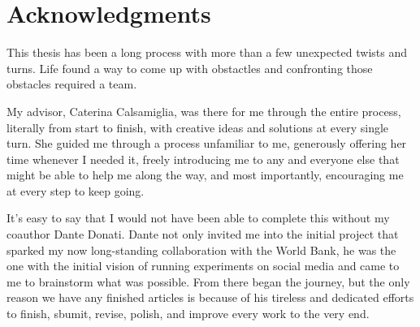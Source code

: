\chapter*{Acknowledgments}

This thesis has been a long process with more than a few unexpected twists and turns. Life found a way to come up with obstactles and confronting those obstacles required a team. 

My advisor, Caterina Calsamiglia, was there for me through the entire process, literally from start to finish, with creative ideas and solutions at every single turn. She guided me through a process unfamiliar to me, generously offering her time whenever I needed it, freely introducing me to any and everyone else that might be able to help me along the way, and most importantly, encouraging me at every step to keep going. 

It's easy to say that I would not have been able to complete this without my coauthor Dante Donati. Dante not only invited me into the initial project that sparked my now long-standing collaboration with the World Bank, he was the one with the initial vision of running experiments on social media and came to me to brainstorm what was possible. From there began the journey, but the only reason we have any finished articles is because of his tireless and dedicated efforts to finish, sbumit, revise, polish, and improve every work to the very end. 


\cleardoublepage

